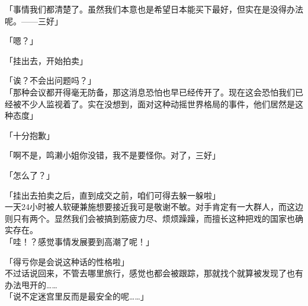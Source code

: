 「事情我们都清楚了。虽然我们本意也是希望日本能买下最好，但实在是没得办法呢。——三好」

「嗯？」

「挂出去，开始拍卖」

「诶？不会出问题吗？」\\

「那种会议都开得毫无防备，那这消息恐怕也早已经传开了。现在这会恐怕我们已经被不少人监视着了。实在没想到，面对这种动摇世界格局的事件，他们居然是这种态度」

「十分抱歉」

「啊不是，鸣濑小姐你没错，我不是要怪你。对了，三好」

「怎么了？」

「挂出去拍卖之后，直到成交之前，咱们可得去躲一躲啦」\\

一天24小时被人软硬兼施想要接近我可是敬谢不敏。对手肯定有一大群人，而这边则只有两个。显然我们会被搞到筋疲力尽、烦烦躁躁，而擅长这种把戏的国家也确实存在。\\

「哇！？感觉事情发展要到高潮了呢！」

「得亏你是会说这种话的性格啦」\\

不过话说回来，不管去哪里旅行，感觉也都会被跟踪，那就找个就算被发现了也有办法甩开的……\\

「说不定迷宫里反而是最安全的呢……」

